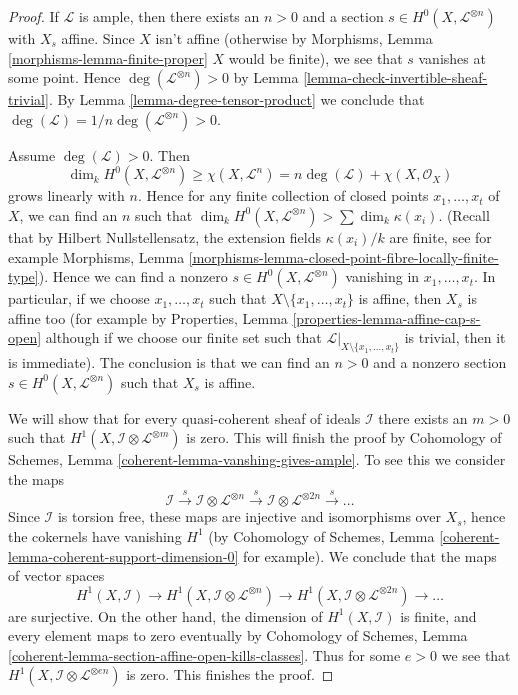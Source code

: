 \begin{proof}
If $\mathcal{L}$ is ample, then there exists an $n > 0$ and a section
$s \in H^0(X, \mathcal{L}^{\otimes n})$ with $X_s$ affine. Since
$X$ isn't affine (otherwise by
Morphisms, Lemma \ref{morphisms-lemma-finite-proper}
$X$ would be finite), we see that $s$ vanishes at some point.
Hence $\deg(\mathcal{L}^{\otimes n}) > 0$ by
Lemma \ref{lemma-check-invertible-sheaf-trivial}.
By Lemma \ref{lemma-degree-tensor-product}
we conclude that $\deg(\mathcal{L}) = 1/n\deg(\mathcal{L}^{\otimes n}) > 0$.

\medskip\noindent
Assume $\deg(\mathcal{L}) > 0$. Then
$$
\dim_k H^0(X, \mathcal{L}^{\otimes n}) \geq \chi(X, \mathcal{L}^n)
= n\deg(\mathcal{L}) + \chi(X, \mathcal{O}_X)
$$
grows linearly with $n$. Hence for any finite collection of closed
points $x_1, \ldots, x_t$ of $X$, we can find an $n$ such that
$\dim_k H^0(X, \mathcal{L}^{\otimes n}) > \sum \dim_k \kappa(x_i)$.
(Recall that by Hilbert Nullstellensatz, the extension fields
$\kappa(x_i)/k$ are finite, see for example
Morphisms, Lemma \ref{morphisms-lemma-closed-point-fibre-locally-finite-type}).
Hence we can find a nonzero $s \in H^0(X, \mathcal{L}^{\otimes n})$
vanishing in $x_1, \ldots, x_t$. In particular, if we choose
$x_1, \ldots, x_t$ such that $X \setminus \{x_1, \ldots, x_t\}$
is affine, then $X_s$ is affine too
(for example by Properties, Lemma \ref{properties-lemma-affine-cap-s-open}
although if we choose our finite set such that
$\mathcal{L}|_{X \setminus \{x_1, \ldots, x_t\}}$ is trivial, then
it is immediate). The conclusion is that we can find an $n > 0$
and a nonzero section $s \in H^0(X, \mathcal{L}^{\otimes n})$ such
that $X_s$ is affine.

\medskip\noindent
We will show that for every quasi-coherent sheaf of ideals $\mathcal{I}$
there exists an $m > 0$ such that
$H^1(X, \mathcal{I} \otimes \mathcal{L}^{\otimes m})$ is zero.
This will finish the proof by
Cohomology of Schemes, Lemma \ref{coherent-lemma-vanshing-gives-ample}.
To see this we consider the maps
$$
\mathcal{I} \xrightarrow{s}
\mathcal{I} \otimes \mathcal{L}^{\otimes n} \xrightarrow{s}
\mathcal{I} \otimes \mathcal{L}^{\otimes 2n} \xrightarrow{s} \ldots
$$
Since $\mathcal{I}$ is torsion free, these maps are injective and
isomorphisms over $X_s$, hence the cokernels have vanishing $H^1$
(by Cohomology of Schemes, Lemma
\ref{coherent-lemma-coherent-support-dimension-0} for example).
We conclude that the maps of vector spaces
$$
H^1(X, \mathcal{I}) \to
H^1(X, \mathcal{I} \otimes \mathcal{L}^{\otimes n}) \to
H^1(X, \mathcal{I} \otimes \mathcal{L}^{\otimes 2n}) \to \ldots
$$
are surjective. On the other hand, the dimension of $H^1(X, \mathcal{I})$
is finite, and every element maps to zero eventually by
Cohomology of Schemes, Lemma
\ref{coherent-lemma-section-affine-open-kills-classes}.
Thus for some $e > 0$ we see that
$H^1(X, \mathcal{I} \otimes \mathcal{L}^{\otimes en})$ is zero.
This finishes the proof.
\end{proof}

